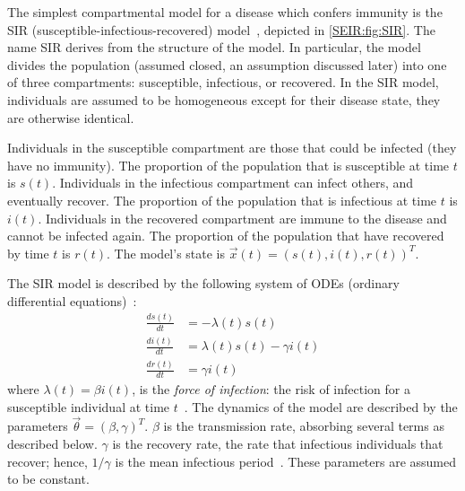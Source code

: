 \documentclass[thesis.tex]{subfiles}
\begin{document}
The simplest compartmental model for a disease which confers immunity is the SIR (susceptible-infectious-recovered) model~\autocite[15]{keelingModeling}, depicted in \cref{SEIR:fig:SIR}.
The name SIR derives from the structure of the model.
In particular, the model divides the population (assumed closed, an assumption discussed later) into one of three compartments: susceptible, infectious, or recovered.
In the SIR model, individuals are assumed to be homogeneous except for their disease state, \ie they are otherwise identical.

Individuals in the susceptible compartment are those that could be infected (they have no immunity).
The proportion of the population that is susceptible at time $t$ is $s(t)$.
Individuals in the infectious compartment can infect others, and eventually recover.
The proportion of the population that is infectious at time $t$ is $i(t)$.
Individuals in the recovered compartment are immune to the disease and cannot be infected again.
The proportion of the population that have recovered by time $t$ is $r(t)$.
The model's state is $\vec{x}(t) = (s(t), i(t), r(t))^T$.

The SIR model is described by the following system of ODEs (ordinary differential equations)~\autocite[19]{keelingModeling}:
\begin{align}
\frac{ds(t)}{dt} &= -\lambda(t) s(t) \\
\frac{di(t)}{dt} &= \lambda(t) s(t) - \gamma i(t) \\
\frac{dr(t)}{dt} &= \gamma i(t)
\end{align}
where $\lambda(t) = \beta i(t)$, is the \emph{force of infection}: the risk of infection for a susceptible individual at time $t$~\autocite[17]{keelingModeling}.
The dynamics of the model are described by the parameters $\vec{\theta} = (\beta, \gamma)^T$.
$\beta$ is the transmission rate, absorbing several terms as described below.
$\gamma$ is the recovery rate, the rate that infectious individuals that recover; hence, $1/\gamma$ is the mean infectious period~\autocite[367]{keelingModeling}.
These parameters are assumed to be constant.
\end{document}
